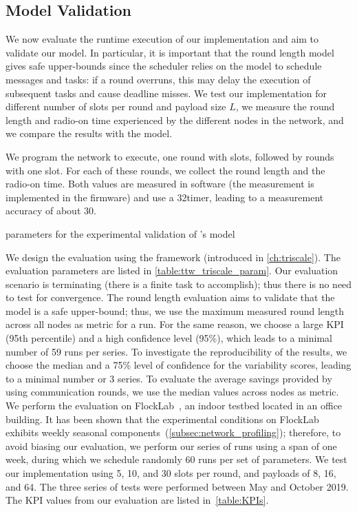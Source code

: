 \subsection{Model Validation}

We now evaluate the runtime execution of our implementation and aim to validate our \TTnet model.
In particular, it is important that the round length model gives safe upper-bounds since the \TTW scheduler relies on the model to schedule messages and tasks: if a round overruns, this may delay the execution of subsequent tasks and cause deadline misses.
We test our \TTnet implementation for different number of slots per round \nslots and payload size $L$, we measure the round length and radio-on time experienced by the different nodes in the network, and we compare the results with the \TTnet model.

We program the network to execute, one round with \nslots slots, followed by \nslots rounds with one slot.
For each of these rounds, we collect the round length and the radio-on time. Both values are measured in software (\ie the measurement is implemented in the firmware) and use a 32\kHz timer, leading to a measurement accuracy of about 30\us.

\begin{table}
  \centering
  \caption{\triscale parameters for the experimental validation of \TTnet's model}
  \label{table:ttw_triscale_param}
  {\smaller }
\end{table}


We design the evaluation using the \triscale framework (introduced in \cref{ch:triscale}). The evaluation parameters are listed in \cref{table:ttw_triscale_param}.
Our evaluation scenario is terminating (there is a finite task to accomplish); thus there is no need to test for convergence.
The round length evaluation aims to validate that the \TTnet model is a safe upper-bound; thus, we use the maximum measured round length across all nodes as metric for a run.
For the same reason, we choose a large KPI (95th percentile) and a high confidence level (95\%), which leads to a minimal number of 59 runs per series.
To investigate the reproducibility of the results, we choose the median and a 75\% level of confidence for the variability scores, leading to a minimal number or 3 series.
To evaluate the average savings provided by using communication rounds, we use the median values across nodes as metric.
We perform the evaluation on FlockLab~\cite{FlockLab}, an indoor testbed located in an office building. It has been shown that the experimental conditions on FlockLab exhibits weekly seasonal components~(\cref{subsec:network_profiling}); therefore, to avoid biasing our evaluation, we perform our series of runs using a span of one week, during which we schedule randomly 60 runs per set of parameters. We test our \TTnet implementation using 5, 10, and 30 slots per round, and payloads of 8, 16, and 64\bytes.
The three series of tests were performed between May and October 2019.
The KPI values from our evaluation are listed in~\cref{table:KPIs}.

